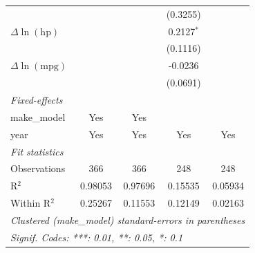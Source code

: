 \begin{table}[htbp]
\begin{tabular}{lcccc}
                                                                              &               &               & (0.3255)     &   \\
      $\Delta\ln(\text{hp})$                                                  &               &               & 0.2127$^{*}$ &   \\
                                                                              &               &               & (0.1116)     &   \\
      $\Delta\ln(\text{mpg})$                                                 &               &               & -0.0236      &   \\
                                                                              &               &               & (0.0691)     &   \\
      \midrule
      \emph{Fixed-effects}\\
      make\_model                                                             & Yes           & Yes           &              & \\
      year                                                                    & Yes           & Yes           & Yes          & Yes\\
      \midrule
      \emph{Fit statistics}\\
      Observations                                                            & 366           & 366           & 248          & 248\\
      R$^2$                                                                   & 0.98053       & 0.97696       & 0.15535      & 0.05934\\
      Within R$^2$                                                            & 0.25267       & 0.11553       & 0.12149      & 0.02163\\
      \midrule \midrule
      \multicolumn{5}{l}{\emph{Clustered (make\_model) standard-errors in parentheses}}\\
      \multicolumn{5}{l}{\emph{Signif. Codes: ***: 0.01, **: 0.05, *: 0.1}}\\
   \end{tabular}
\end{table}


